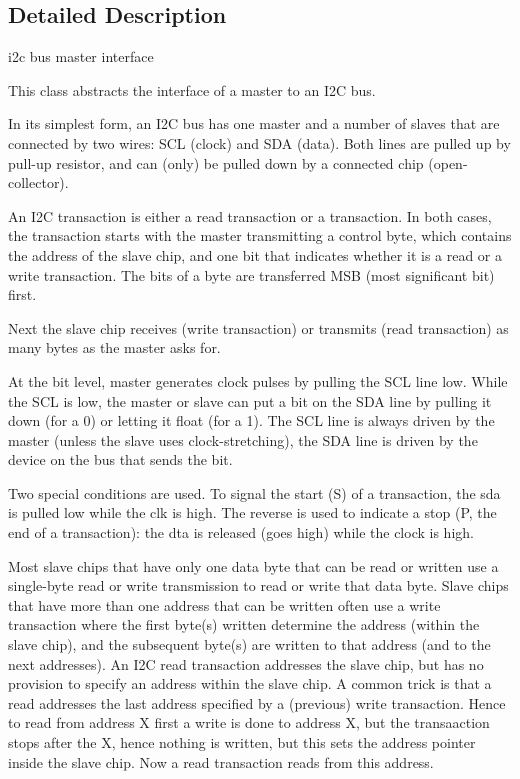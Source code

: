 \subsection{Detailed Description}
i2c bus master interface 

This class abstracts the interface of a master to an I2C bus.

In its simplest form, an I2C bus has one master and a number of slaves that are connected by two wires\+: S\+CL (clock) and S\+DA (data). Both lines are pulled up by pull-\/up resistor, and can (only) be pulled down by a connected chip (open-\/collector).



An I2C transaction is either a read transaction or a transaction. In both cases, the transaction starts with the master transmitting a control byte, which contains the address of the slave chip, and one bit that indicates whether it is a read or a write transaction. The bits of a byte are transferred M\+SB (most significant bit) first.





Next the slave chip receives (write transaction) or transmits (read transaction) as many bytes as the master asks for.



At the bit level, master generates clock pulses by pulling the S\+CL line low. While the S\+CL is low, the master or slave can put a bit on the S\+DA line by pulling it down (for a 0) or letting it float (for a 1). The S\+CL line is always driven by the master (unless the slave uses clock-\/stretching), the S\+DA line is driven by the device on the bus that sends the bit.



Two special conditions are used. To signal the start (S) of a transaction, the sda is pulled low while the clk is high. The reverse is used to indicate a stop (P, the end of a transaction)\+: the dta is released (goes high) while the clock is high.



Most slave chips that have only one data byte that can be read or written use a single-\/byte read or write transmission to read or write that data byte. Slave chips that have more than one address that can be written often use a write transaction where the first byte(s) written determine the address (within the slave chip), and the subsequent byte(s) are written to that address (and to the next addresses). An I2C read transaction addresses the slave chip, but has no provision to specify an address within the slave chip. A common trick is that a read addresses the last address specified by a (previous) write transaction. Hence to read from address X first a write is done to address X, but the transaaction stops after the X, hence nothing is written, but this sets the address pointer inside the slave chip. Now a read transaction reads from this address.

